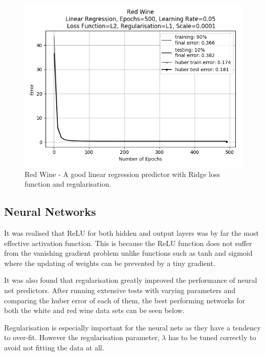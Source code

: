 \documentclass[10pt,twocolumn,letterpaper]{article}
\begin{document}
\begin{figure}[h]
	\begin{center}
		\includegraphics[width=0.9\linewidth]{img/l2_reg.png}
	\end{center}
	\caption{Red Wine - A good linear regression predictor with Ridge loss function and regularisation.}
	\label{fig:l2reg}
\end{figure}

\subsection{Neural Networks}
It was realised that ReLU for both hidden and output layers was by far the most effective activation function. This is because the ReLU function does not suffer from the vanishing gradient problem unlike functions such as tanh and sigmoid where the updating of weights can be prevented by a tiny gradient. 

It was also found that regularisation greatly improved the performance of neural net predictors. After running extensive tests with varying parameters and comparing the huber error of each of them, the best performing networks for both the white and red wine data sets can be seen below.

Regularisation is especially important for the neural nets as they have a tendency to over-fit. However the regularisation parameter, $\lambda$ has to be tuned correctly to avoid not fitting the data at all.
\end{document}
